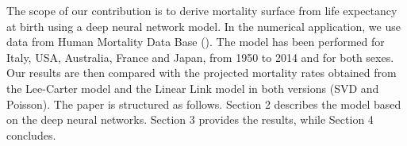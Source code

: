 \documentclass[a4,11pt]{article}
\begin{document}



The scope of our contribution is to derive mortality surface from life expectancy at birth using a deep neural network model.
In the numerical application, we use data from Human Mortality Data Base (\cite{HM}). The model has been performed for Italy, USA, Australia, France and Japan, from 1950 to 2014 and for both sexes. Our results are then compared with the projected mortality rates obtained from the Lee-Carter model \citep{LC1992}  and the Linear Link \cite{PascariuLL} model in both versions (SVD and Poisson).
The paper is structured as follows. Section 2 describes the model based on the deep neural networks. Section 3 provides the results, while Section 4 concludes.

\end{document}
